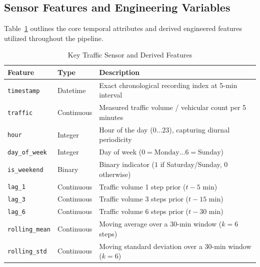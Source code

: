 \documentclass[12pt,a4paper]{article}
\begin{document}
\subsection{Sensor Features and Engineering Variables}
Table~\ref{tab:features_desc} outlines the core temporal attributes and derived engineered features utilized throughout the pipeline.

\begin{table}[H]
    \centering
    \caption{Key Traffic Sensor and Derived Features}
    \label{tab:features_desc}
    \renewcommand{\arraystretch}{1.3}
    \begin{tabular}{|l|l|p{7.5cm}|}
        \hline
        \textbf{Feature} & \textbf{Type} & \textbf{Description} \\
        \hline
        \texttt{timestamp} & Datetime & Exact chronological recording index at 5-min interval \\
        \hline
        \texttt{traffic} & Continuous & Measured traffic volume / vehicular count per 5 minutes \\
        \hline
        \texttt{hour} & Integer & Hour of the day ($0 \dots 23$), capturing diurnal periodicity \\
        \hline
        \texttt{day\_of\_week} & Integer & Day of week ($0 = \text{Monday} \dots 6 = \text{Sunday}$) \\
        \hline
        \texttt{is\_weekend} & Binary & Binary indicator ($1$ if Saturday/Sunday, $0$ otherwise) \\
        \hline
        \texttt{lag\_1} & Continuous & Traffic volume 1 step prior ($t - 5\text{ min}$) \\
        \hline
        \texttt{lag\_3} & Continuous & Traffic volume 3 steps prior ($t - 15\text{ min}$) \\
        \hline
        \texttt{lag\_6} & Continuous & Traffic volume 6 steps prior ($t - 30\text{ min}$) \\
        \hline
        \texttt{rolling\_mean} & Continuous & Moving average over a 30-min window ($k=6$ steps) \\
        \hline
        \texttt{rolling\_std} & Continuous & Moving standard deviation over a 30-min window ($k=6$) \\
        \hline
    \end{tabular}
\end{table}

\end{document}
